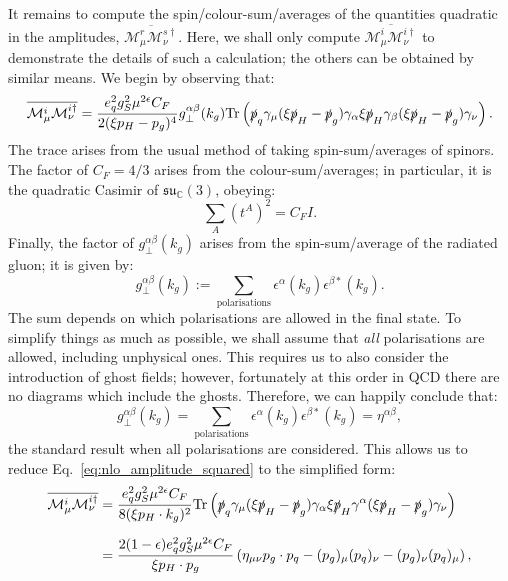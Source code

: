 \documentclass[withindex,glossary]{cam-thesis}
\begin{document}
\noindent It remains to compute the spin/colour-sum/averages of the quantities quadratic in the amplitudes, $\overline{\mathcal{M}_{\mu}^r \mathcal{M}_{\nu}^{s\dagger}}$. Here, we shall only compute $\overline{\mathcal{M}_{\mu}^i \mathcal{M}_{\nu}^{i\dagger}}$ to demonstrate the details of such a calculation; the others can be obtained by similar means. We begin by observing that:
\begin{equation}
\label{eq:nlo_amplitude_squared}
\overline{\mathcal{M}_{\mu}^i \mathcal{M}_{\nu}^{i\dagger}} = \frac{e_q^2 g_S^2 \mu^{2\epsilon} C_F}{2(\xi p_H - p_g)^4} g^{\alpha\beta}_{\perp}(k_g) \textrm{Tr}\left( \slashed{p}_q \gamma_{\mu} (\xi \slashed{p}_H - \slashed{p}_g) \gamma_{\alpha} \xi \slashed{p}_H \gamma_{\beta} (\xi \slashed{p}_H - \slashed{p}_g) \gamma_{\nu} \right).
\end{equation}
The trace arises from the usual method of taking spin-sum/averages of spinors. The factor of $C_F = 4/3$ arises from the colour-sum/averages; in particular, it is the quadratic Casimir of $\mathfrak{su}_{\mathbb{C}}(3)$, obeying:
\begin{equation}
\sum_{A} (t^A)^2 = C_F I.
\end{equation}
Finally, the factor of $g^{\alpha\beta}_{\perp}(k_g)$ arises from the spin-sum/average of the radiated gluon; it is given by:
\begin{equation}
g^{\alpha\beta}_{\perp}(k_g) := \sum_{\text{polarisations}} \epsilon^{\alpha}(k_g) \epsilon^{\beta*}(k_g).
\end{equation} 
The sum depends on which polarisations are allowed in the final state. To simplify things as much as possible, we shall assume that \textit{all} polarisations are allowed, including unphysical ones. This requires us to also consider the introduction of ghost fields; however, fortunately at this order in QCD there are no diagrams which include the ghosts. Therefore, we can happily conclude that:
\begin{equation}
g^{\alpha\beta}_{\perp}(k_g) = \sum_{\text{polarisations}} \epsilon^{\alpha}(k_g) \epsilon^{\beta*}(k_g) = \eta^{\alpha\beta},
\end{equation}
the standard result when all polarisations are considered. This allows us to reduce Eq.~\eqref{eq:nlo_amplitude_squared} to the simplified form:
\begin{align}
\overline{\mathcal{M}_{\mu}^i \mathcal{M}_{\nu}^{i\dagger}} &= \frac{e_q^2 g_S^2 \mu^{2\epsilon} C_F}{8(\xi p_H \cdot k_g)^2} \textrm{Tr}\left( \slashed{p}_q \gamma_{\mu} (\xi \slashed{p}_H - \slashed{p}_g) \gamma_{\alpha} \xi \slashed{p}_H \gamma^{\alpha} (\xi \slashed{p}_H - \slashed{p}_g) \gamma_{\nu} \right)\notag\\[1.5ex]
&= \frac{2 (1-\epsilon) e_q^2 g_S^2 \mu^{2\epsilon} C_F}{\xi p_H \cdot p_g}  \left( \eta_{\mu\nu} p_g \cdot p_q - (p_g)_{\mu} (p_q)_{\nu} - (p_g)_{\nu} (p_q)_{\mu}\right),
\end{align}
\end{document}
